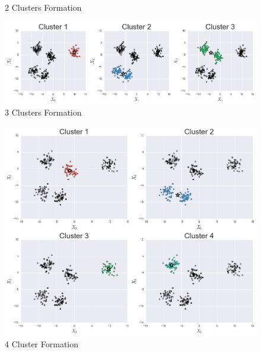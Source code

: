 \documentclass[10pt,twocolumn,letterpaper]{article}
\begin{document}
\begin{appendices}
\begin{figure}[htbp]
\caption{\label{fig:2-Clusters-Formation}2 Clusters Formation}


\end{figure}


\begin{figure}[htbp] 
\begin{center}
\includegraphics[scale=0.55]{figure/3_formation.png}
\end{center}

\caption{\label{fig:3-Clusters-Formation}3 Clusters Formation}
\end{figure}


\begin{figure}[htbp] 
\begin{center}
\includegraphics[scale=0.55]{figure/4_formation.png}
\end{center}

\caption{\label{fig:4-Cluster-Formation}4 Cluster Formation}


\end{figure}



\end{appendices}
\end{document}

